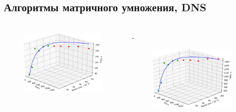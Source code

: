 \documentclass[unicode, t, 11pt]{beamer}%
\newlength{\mylen}
\begin{document}
		\subsection{Алгоритмы матричного умножения, DNS}
			\begin{frame}
				\footnotesize
				\frametitle{\insertsection}
		 		\framesubtitle{\insertsubsection}
				\begin{columns}[T]
					\setlength{\mylen}{0.5\textwidth}
					\begin{column}{\mylen}
						\begin{figure}
							\captionsetup{font=tiny, labelfont=tiny}
							\centering
							\includegraphics[width=.7\textwidth]{./images/dns_k2}
						\end{figure}
					\end{column}
					\begin{column}{\dimexpr\textwidth-\mylen}
						\begin{figure}
							\captionsetup{font=tiny, labelfont=tiny}
							\centering
							\includegraphics[width=.7\textwidth]{./images/dns_k1}
						\end{figure}
					\end{column}
				\end{columns}

\end{frame}
\end{document}
